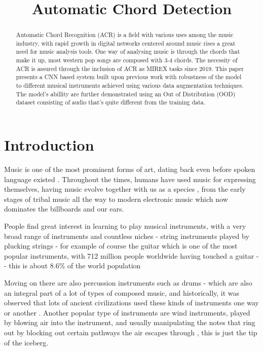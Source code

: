 \documentclass[a4paper]{article}
\title{Automatic Chord Detection}
\begin{document}
\maketitle

    \begin{abstract}
      Automatic Chord Recognition (ACR) is a field with various uses among the music industry, with rapid growth in digital networks centered around music rises a great need for music analysis tools. One way of analysing music is through the chords that make it up, most western pop songs are composed with 3-4 chords. The necessity of ACR is assured through the inclusion of ACR as MIREX tasks since 2019. This paper presents a CNN based system  built upon previous work with robustness of the model to different musical instruments achieved using various data augmentation techniques. The model's abillity are further demonstrated using an Out of Distribution (OOD) dataset consisting of audio that's quite different from the training data.
   \end{abstract}
\section{Introduction}
Music is one of the most prominent forms of art, dating back even before spoken language existed \cite{music_before_language}. Throughout the times, humans have used music for expressing themselves, having music evolve together with us as a species \cite{music_human_evolution}, from the early stages of tribal music all the way to modern electronic music which now dominates the billboards and our ears.

People find great interest in learning to play musical instruments, with a very broad range of instruments and countless niches - string instruments played by plucking strings - for example of course the guitar which is one of the most popular instruments, with 712 million people worldwide having touched a guitar - \citeauthor{guitar_players_amount} - this is about 8.6\% of the world population \citep{world_population}

Moving on there are also percussion instruments such as drums - which are also an integral part of a lot of types of composed music, and historically, it was observed that lots of ancient civilizations used these kinds of instruments one way or another \cite{percussion_ancient}.
Another popular type of instruments are wind instruments, played by blowing air into the instrument, and usually manipulating the notes that ring out by blocking out certain pathways the air escapes through \citep{wind_instruments}, this is just the tip of the iceberg.
\end{document}

